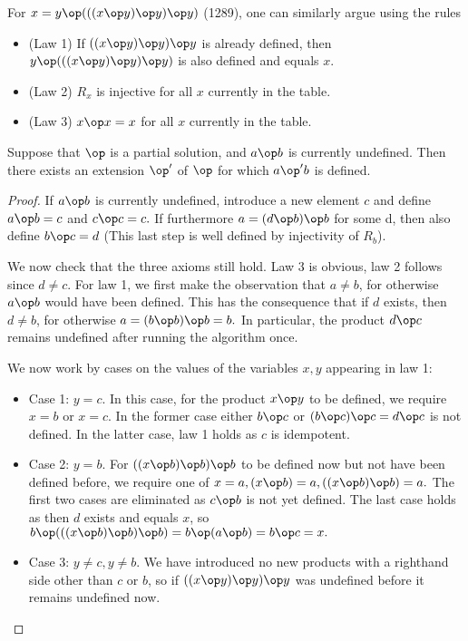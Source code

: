 For $x = y \op (((x \op y) \op y) \op y)$ (1289), one can similarly argue using the rules
\begin{itemize}
\item (Law 1) If $((x \op y) \op y) \op y$ is already defined, then $y \op (((x \op y) \op y) \op y)$ is also defined and equals $x$.
\item (Law 2) $R_x$ is injective for all $x$ currently in the table.
\item (Law 3) $x\op x=x$ for all $x$ currently in the table.
\end{itemize}

\begin{lemma}[1289 extension]\label{1289-extension}\leanok{}  Suppose that $\op$ is a partial solution, and $a \op b$ is currently undefined.  Then there exists an extension $\op'$ of $\op$ for which $a \op' b$ is defined.
\end{lemma}

\begin{proof}
If $a \op b$ is currently undefined, introduce a new element $c$ and define $a \op b = c$ and $ c \op c = c.$ If furthermore $a = (d \op b) \op b$ for some d, then also define $b \op c = d$ (This last step is well defined by injectivity of $R_b$).

We now check that the three axioms still hold. Law 3 is obvious, law 2 follows since $d \not = c$. For law 1, we first make the observation that $a \not = b$, for otherwise $a \op b$ would have been defined. This has the consequence that if $d$ exists, then $d \not = b$, for otherwise $a = (b \op b) \op b = b.$ In particular, the product $d \op c$ remains undefined after running the algorithm once.

We now work by cases on the values of the variables $x,y$ appearing in law 1:
\begin{itemize}
\item Case 1: $y=c$. In this case, for the product $x \op y$ to be defined, we require $x =b$ or $x = c$. In the former case either $b \op c$ or $(b \op c) \op c = d \op c$ is not defined. In the latter case, law 1 holds as $c$ is idempotent.
\item Case 2: $y=b$. For $((x \op b) \op b) \op b$ to be defined now but not have been defined before, we require one of $x= a, (x \op b) = a, ((x \op b) \op b) = a.$ The first two cases are eliminated as $c \op b$ is not yet defined. The last case holds as then $d$ exists and equals $x$, so $b \op (((x \op b) \op b) \op b) = b \op (a \op b) = b \op c = x.$
\item Case 3: $y \not = c, y \not = b$. We have introduced no new products with a righthand side other than $c$ or $b$, so if $((x \op y) \op y) \op y$ was undefined before it remains undefined now.
\end{itemize}
\end{proof}

